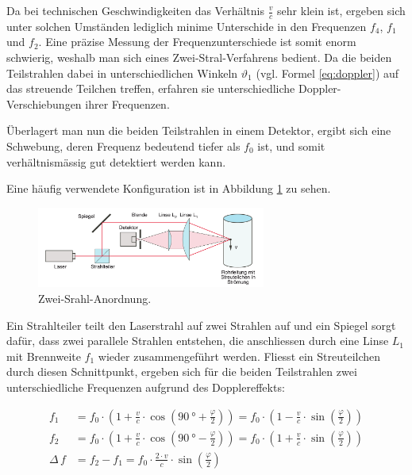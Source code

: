 Da  bei  technischen  Geschwindigkeiten das  Verh\"altnis  $\frac{v}{c}$  sehr
klein   ist,  ergeben   sich  unter   solchen  Umst\"anden   lediglich  minime
Unterschide  in   den  Frequenzen  $f_4$,  $f_1$   und  $f_2$. Eine  pr\"azise
Messung  der  Frequenzunterschiede  ist  somit enorm  schwierig,  weshalb  man
sich  eines Zwei-Stral-Verfahrens  bedient. Da die  beiden Teilstrahlen  dabei
in  unterschiedlichen  Winkeln  $\vartheta_1$  (vgl. Formel  \ref{eq:doppler})
auf   das   streuende   Teilchen  treffen,   erfahren   sie   unterschiedliche
Doppler-Verschiebungen ihrer Frequenzen.

\"Uberlagert man  nun die beiden  Teilstrahlen in einem Detektor,  ergibt sich
eine  Schwebung, deren  Frequenz bedeutend  tiefer  als $f_0$  ist, und  somit
verh\"altnism\"assig gut detektiert werden kann.

Eine     h\"aufig     verwendete     Konfiguration    ist     in     Abbildung
\ref{fig:zweistrahl-anordnung} zu sehen.

\begin{figure}[h!t]
    \centering
    \includegraphics[width=0.67\textwidth]{images/zweistrahl-anordnung.png}
    \caption{%
        Zwei-Srahl-Anordnung. \quelleVA
    }
    \label{fig:zweistrahl-anordnung}
\end{figure}

Ein Strahlteiler teilt  den Laserstrahl auf zwei Strahlen auf  und ein Spiegel
sorgt daf\"ur, dass zwei parallele  Strahlen entstehen, die anschliessen durch
eine Linse $L_1$ mit Brennweite $f_1$ wieder zusammengef\"uhrt werden. Fliesst
ein Streuteilchen durch diesen Schnittpunkt, ergeben sich f\"ur die beiden Teilstrahlen
zwei unterschiedliche Frequenzen aufgrund des Dopplereffekts:

\begin{align}
    \label{eq:splitFreqs1}
        f_1 &= f_0 \cdot
            \left(
                1 + \frac{v}{c} \cdot \cos\left( \SI{90}{\degree} + \frac{\varphi}{2} \right)
            \right)
            =
            f_0 \cdot
            \left(
                1 - \frac{v}{c} \cdot \sin\left(\frac{\varphi}{2}\right)
            \right)
            \\
        \label{eq:splitFreqs2}
        f_2 &= f_0 \cdot
            \left(
                1 + \frac{v}{c} \cdot \cos\left( \SI{90}{\degree} - \frac{\varphi}{2} \right)
            \right)
            =
            f_0 \cdot
            \left(
                1 + \frac{v}{c} \cdot \sin\left(\frac{\varphi}{2}\right)
            \right)
            \\
        \label{eq:splitFreqsDelta}
        \Delta\,f &= f_2 - f_1 = f_0 \cdot \frac{2 \cdot v}{c} \cdot \sin\left( \frac{\varphi}{2}\right)
\end{align}

